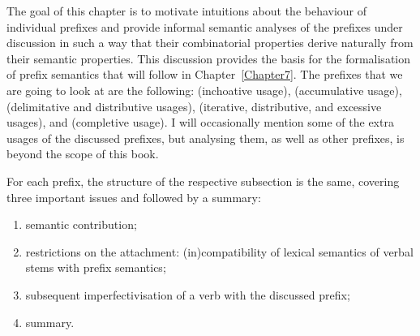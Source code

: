  

The goal of this chapter is to motivate intuitions about the behaviour of individual prefixes and provide informal semantic analyses of the prefixes under discussion in such a way that their combinatorial properties derive naturally from their semantic properties. 
This discussion provides the basis for the formalisation of prefix semantics that will follow in Chapter~\ref{Chapter7}. The prefixes that we are going to look at are the following:  (inchoative usage),  (accumulative usage),  (delimitative and distributive usages),  (iterative, distributive, and excessive usages), and  (completive usage). I will occasionally mention some of the extra usages of the discussed prefixes, but analysing them, as well as other prefixes, is beyond the scope of this book.

For each prefix, the structure of the respective subsection is the same, covering three important issues and followed by a summary:
\begin{enumerate}
\item semantic contribution;
\item restrictions on the attachment: (in)compatibility of lexical semantics of verbal stems with prefix semantics;
\item subsequent imperfectivisation of a verb with the discussed prefix;
\item summary.
\end{enumerate}

